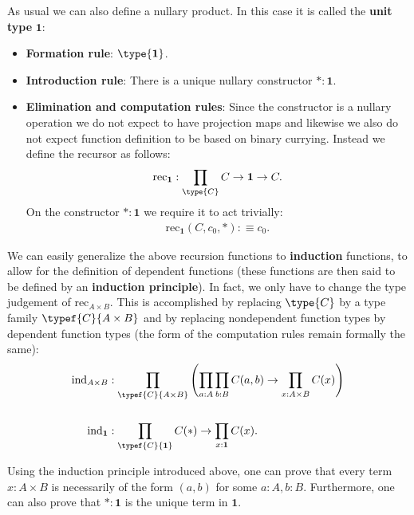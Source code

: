 {        As usual we can also define a nullary product. In this case it is called the \textbf{unit type} $\mathbf{1}$:
        \begin{itemize}
            \item \textbf{Formation rule}: $\type{\mathbf{1}}$.
            \item \textbf{Introduction rule}: There is a unique nullary constructor $\ast:\mathbf{1}$.
            \item \textbf{Elimination and computation rules}: Since the constructor is a nullary operation we do not expect to have projection maps and likewise we also do not expect function definition to be based on binary currying. Instead we define the recursor as follows:
            \begin{gather}
                \text{rec}_{\mathbf{1}}:\prod_{\type{C}}C\rightarrow\mathbf{1}\rightarrow C.
            \end{gather}
            On the constructor $\ast:\mathbf{1}$ we require it to act trivially:
            \begin{gather}
                \text{rec}_{\mathbf{1}}(C, c_0, \ast):\equiv c_0.
            \end{gather}
        \end{itemize}
        We can easily generalize the above recursion functions to \textbf{induction} functions, to allow for the definition of dependent functions (these functions are then said to be defined by an \textbf{induction principle}). In fact, we only have to change the type judgement of $\text{rec}_{A\times B}$. This is accomplished by replacing $\type{C}$ by a type family $\typef{C}{A\times B}$ and by replacing nondependent function types by dependent function types (the form of the computation rules remain formally the same):
        \begin{align}
            \text{ind}_{A\times B}&:\prod_{\typef{C}{A\times B}}\left(\prod_{a:A}\prod_{b:B}C(a,b)\rightarrow\prod_{x:A\times B}C(x)\right)\\
            &\nonumber\\
            \text{ind}_{\mathbf{1}}&:\prod_{\typef{C}{\mathbf{1}}}C(\ast)\rightarrow\prod_{x:\mathbf{1}}C(x).
        \end{align}
    }

    \begin{property}
        Using the induction principle introduced above, one can prove that every term $x:A\times B$ is necessarily of the form $(a,b)$ for some $a:A, b:B$. Furthermore, one can also prove that $\ast:\mathbf{1}$ is the unique term in $\mathbf{1}$.
    \end{property}


